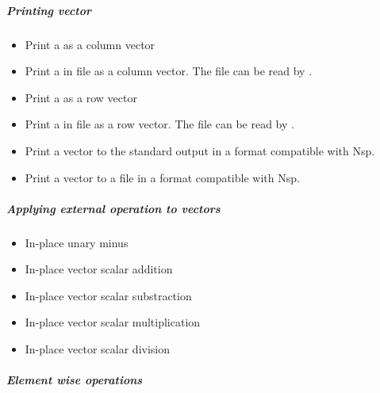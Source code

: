 \subparagraph{Printing vector}
\begin{itemize}
\item {}
  \sshortdescribe Print a \PnlVect as a column vector
\item {}
  \sshortdescribe Print a \PnlVect in file  as a column
  vector. The file can be read by .
\item {}
  \sshortdescribe Print a \PnlVect as a row vector
\item {}
  \sshortdescribe Print a \PnlVect in file  as a row
  vector. The file can be read by .
\item {}
  \sshortdescribe Print a vector to the standard output in a format
  compatible with Nsp.
\item {}
  \sshortdescribe Print a vector to a file in a format compatible with Nsp.
\end{itemize}

\subparagraph{Applying external operation to vectors}

\begin{itemize}
\item {}
  \sshortdescribe In-place unary minus
\item {}
  \sshortdescribe In-place vector scalar addition  
\item {}
  \sshortdescribe In-place vector scalar substraction  
\item {}
  \sshortdescribe In-place vector scalar multiplication  
\item {}
  \sshortdescribe In-place vector scalar division  
\end{itemize}

\subparagraph{Element wise operations}


